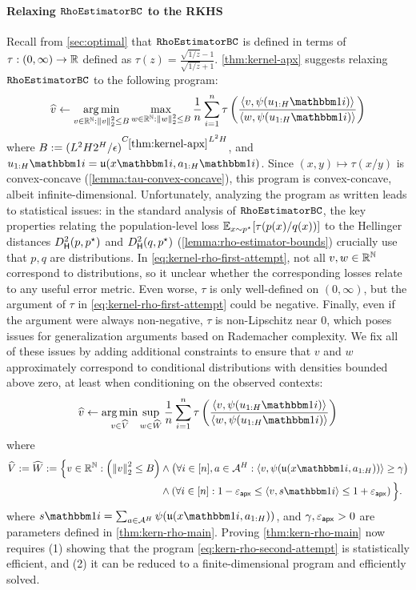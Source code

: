 \paragraph{Relaxing $\texttt{RhoEstimatorBC}$ to the RKHS} Recall from \cref{sec:optimal} that $\texttt{RhoEstimatorBC}$ is defined in terms of $\tau: (0,\infty) \to \mathbb{R}$ defined as $\tau(z) = \frac{\sqrt{1/z} - 1}{\sqrt{1/z} + 1}.$
\cref{thm:kernel-apx} suggests relaxing $\texttt{RhoEstimatorBC}$ to the following program:
\begin{equation} \wh v \gets \argmin_{v \in \RR^\NN:\norm{v}_2^2\leq B} \max_{w \in \RR^\NN:\norm{w}_2^2\leq B} \frac{1}{n} \sum_{i=1}^n \tau\left(\frac{\langle v,\psi(u_{1:H}\ind{i})\rangle}{\langle w, \psi(u_{1:H}\ind{i})\rangle}\right)\label{eq:kernel-rho-first-attempt}\end{equation}
where $B := (L^2H2^H/\epsilon)^{C_{\ref{thm:kernel-apx}}L^2H}$, and $u_{1:H}\ind{i} = \uf(x\ind{i},a_{1:H}\ind{i})$. Since $(x,y) \mapsto \tau(x/y)$ is convex-concave (\cref{lemma:tau-convex-concave}), this program is convex-concave, albeit infinite-dimensional. Unfortunately, analyzing the program as written leads to statistical issues: in the standard analysis of $\texttt{RhoEstimatorBC}$, the key properties relating the population-level loss $\operatorname*{\mathbb{E}}_{x\sim p^\star}[\tau(p(x)/q(x))]$ to the Hellinger distances $\Dhels{p}{p^\st}$ and $\Dhels{q}{p^\st}$ (\cref{lemma:rho-estimator-bounds}) crucially use that $p,q$ are distributions. In \cref{eq:kernel-rho-first-attempt}, not all $v,w \in \mathbb{R}^{\mathbb{N}}$ correspond to distributions, so it unclear whether the corresponding losses relate to any useful error metric. Even worse, $\tau$ is only well-defined on $(0,\infty)$, but the argument of $\tau$ in \cref{eq:kernel-rho-first-attempt} could be negative. Finally, even if the argument were always non-negative, $\tau$ is non-Lipschitz near $0$, which poses issues for generalization arguments based on Rademacher complexity. We fix all of these issues by adding additional constraints to ensure that $v$ and $w$ approximately correspond to conditional distributions with densities bounded above zero, at least when conditioning on the observed contexts:
\begin{equation} \wh v \gets \argmin_{v \in \wh V} \sup_{w \in \wh W} \frac{1}{n} \sum_{i=1}^n \tau\left(\frac{\langle v,\psi(u_{1:H}\ind{i})\rangle}{\langle w, \psi(u_{1:H}\ind{i})\rangle}\right)
\label{eq:kern-rho-second-attempt}
\end{equation}
where
\begin{align} 
\wh V := \wh W := \Big\{v \in \RR^\NN: \left(\norm{v}_2^2 \leq B\right) &\land \left(\forall i \in [n], a \in \MA^H: \langle v, \psi(\uf(x\ind{i},a_{1:H}))\rangle \geq \gamma\right) \\ 
&\land \left(\forall i \in [n]: 1-\epapx \leq \langle v, s\ind{i}\rangle \leq 1+\epapx\right)\Big\}.
\end{align}
where $s\ind{i} = \sum_{a \in \MA^H} \psi(\uf(x\ind{i},a_{1:H}))$, and $\gamma,\varepsilon_{\mathsf{apx}}>0$ are parameters defined in \cref{thm:kern-rho-main}. Proving \cref{thm:kern-rho-main} now requires (1) showing that the program \cref{eq:kern-rho-second-attempt} is statistically efficient, and (2) it can be reduced to a finite-dimensional program and efficiently solved.

